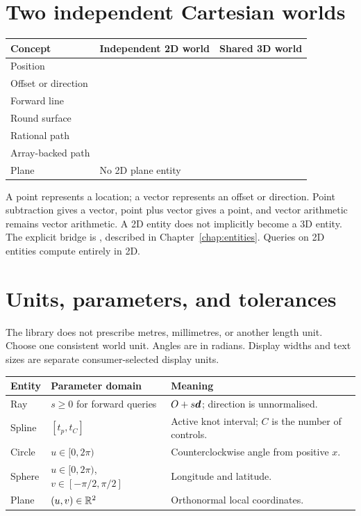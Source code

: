 \section{Two independent Cartesian worlds}
\begin{tabularx}{\linewidth}{@{}lYY@{}}
\toprule
Concept & Independent 2D world & Shared 3D world\\
\midrule
Position &  & \\
Offset or direction &  & \\
Forward line &  & \\
Round surface &  & \\
Rational path &  & \\
Array-backed path & \newline{} & \newline{}\\
Plane & No 2D plane entity & \\
\bottomrule
\end{tabularx}

A point represents a location; a vector represents an offset or direction.
Point subtraction gives a vector, point plus vector gives a point, and vector
arithmetic remains vector arithmetic. A 2D entity does not implicitly become
a 3D entity. The explicit bridge is , described in
Chapter~\ref{chap:entities}. Queries on 2D entities compute entirely in 2D.

\section{Units, parameters, and tolerances}
The library does not prescribe metres, millimetres, or another length unit.
Choose one consistent world unit. Angles are in radians. Display widths and
text sizes are separate consumer-selected display units.

\begin{tabularx}{\linewidth}{@{}lYY@{}}
\toprule
Entity & Parameter domain & Meaning\\
\midrule
Ray & $s\geq0$ for forward queries & $O+s\boldsymbol{d}$; direction is unnormalised.\\
Spline & $[t_p,t_C]$ & Active knot interval; $C$ is the number of controls.\\
Circle & $u\in[0,2\pi)$ & Counterclockwise angle from positive $x$.\\
Sphere & $u\in[0,2\pi)$, $v\in[-\pi/2,\pi/2]$ & Longitude and latitude.\\
Plane & $(u,v)\in\mathbb{R}^2$ & Orthonormal local coordinates.\\
\bottomrule
\end{tabularx}

